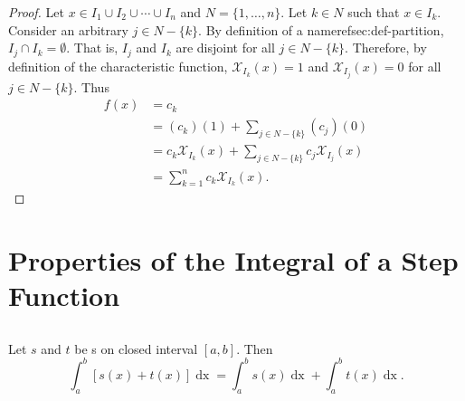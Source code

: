 \documentclass{report}
\begin{document}
\begin{proof}

  Let $x \in I_1 \cup I_2 \cup \cdots \cup I_n$ and $N = \{1, \ldots, n\}$.
  Let $k \in N$ such that $x \in I_k$.
  Consider an arbitrary $j \in N - \{k\}$.
  By definition of a nameref{sec:def-partition}, $I_j \cap I_k = \emptyset$.
  That is, $I_j$ and $I_k$ are disjoint for all $j \in N - \{k\}$.
  Therefore, by definition of the characteristic function,
    $\mathcal{X}_{I_k}(x) = 1$ and $\mathcal{X}_{I_j}(x) = 0$ for all
    $j \in N - \{k\}$.
  Thus
    \begin{align*}
      f(x)
        & = c_k \\
        & = (c_k)(1) + \sum\nolimits_{j \in N - \{k\}} (c_j)(0) \\
        & = c_k\mathcal{X}_{I_k}(x) +
          \sum\nolimits_{j \in N - \{k\}} c_j\mathcal{X}_{I_j}(x) \\
        & = \sum_{k=1}^n c_k\mathcal{X}_{I_k}(x).
    \end{align*}

\end{proof}

\chapter{Properties of the Integral of a Step Function}%
\label{chap:properties-integral-step-function}

\section{}%
\label{sec:step-additive-property}
\label{sec:theorem-1.2}

\begin{theorem}[1.2]

  Let $s$ and $t$ be s on closed interval
    $[a, b]$.
  Then
    $$\int_a^b \left[ s(x) + t(x) \right] \mathop{dx} =
      \int_a^b s(x) \mathop{dx} + \int_a^b t(x) \mathop{dx}.$$

\end{theorem}
\end{document}
